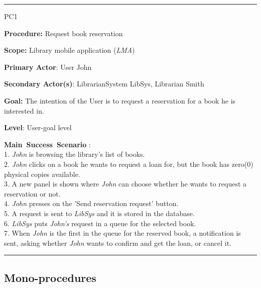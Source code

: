 %

\vspace{0.5cm}
\hrule
\begin{lyxlist}{PC1}
\small{
\item [\textbf{Procedure:}] Request book reservation
\item [\textbf{Scope:}] Library mobile application (\emph{LMA})
\item [\textbf{Primary Actor}:] User John
\item [\textbf{Secondary Actor(s)}:] LibrarianSystem LibSys,
Librarian Smith
\item [\textbf{Goal:}] The intention of the User is to request a reservation for
a book he is interested in.
\item [\textbf{Level}:] User-goal level
\item [\textbf{Main~Success~Scenario}]:\\
1. \emph{John} is browsing the library's list of books. \\
2. \emph{John} clicks on a book he wants to request a loan for, but the book has
zero(0) physical copies available.\\
3. A new panel is shown where \emph{John} can choose whether he wants to
request a reservation or not. \\
4. \emph{John} presses on the 'Send reservation request' button. \\
5. A request is sent to \emph{LibSys} and it is stored in the database. \\
6. \emph{LibSys} puts \emph{John's} request in a queue for the selected book. \\ 
7. When \emph{John} is the first in the queue for the reserved book, a
notification is sent, asking whether \emph{John} wants to confirm and get the
loan, or cancel it. \\

}

\end{lyxlist}
\hrule




\subsection{Mono-procedures}

